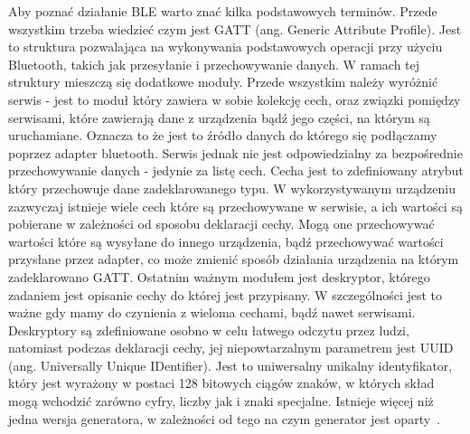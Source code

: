 Aby poznać działanie BLE warto znać kilka podstawowych terminów. Przede wszystkim trzeba wiedzieć czym jest GATT (ang. Generic Attribute Profile). Jest to struktura pozwalająca na wykonywania podstawowych operacji przy użyciu Bluetooth, takich jak przesyłanie i przechowywanie danych.  W ramach tej struktury mieszczą się dodatkowe moduły. Przede wszystkim należy wyróżnić serwis - jest to moduł który zawiera w sobie kolekcję cech, oraz związki pomiędzy serwisami, które zawierają dane z urządzenia bądź jego części, na którym są uruchamiane. Oznacza to że jest to źródło danych do którego się podłączamy poprzez adapter bluetooth. Serwis jednak nie jest odpowiedzialny za bezpośrednie przechowywanie danych - jedynie za listę cech. Cecha jest to zdefiniowany atrybut który przechowuje dane zadeklarowanego typu. W wykorzystywanym urządzeniu zazwyczaj istnieje wiele cech które są przechowywane w serwisie, a ich wartości są pobierane w zależności od sposobu deklaracji cechy. Mogą one przechowywać wartości które są wysyłane do innego urządzenia, bądź przechowywać wartości przysłane przez adapter, co może zmienić sposób działania urządzenia na którym zadeklarowano GATT. Ostatnim ważnym modułem jest deskryptor, którego zadaniem jest opisanie cechy do której jest przypisany. W szczególności jest to ważne gdy mamy do czynienia z wieloma cechami, bądź nawet serwisami. Deskryptory są zdefiniowane osobno w celu łatwego odczytu przez ludzi, natomiast podczas deklaracji cechy, jej niepowtarzalnym parametrem jest UUID (ang. Universally Unique IDentifier). Jest to uniwersalny unikalny identyfikator, który jest wyrażony w postaci 128 bitowych ciągów znaków, w których skład mogą wchodzić zarówno cyfry, liczby jak i znaki specjalne. Istnieje więcej niż jedna wersja generatora, w zależności od tego na czym generator jest oparty~\cite{bleSpec}.
	
